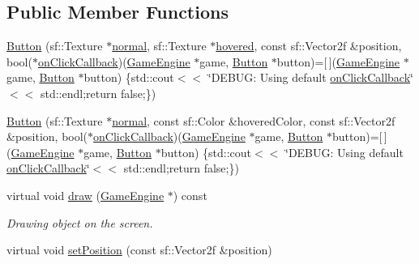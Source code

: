 \subsection*{Public Member Functions}
\begin{DoxyCompactItemize}
\item 
\mbox{\hyperlink{class_button_ad5ab6d97ef7c833c56e968c1202a19b8}{Button}} (sf\+::\+Texture $\ast$\mbox{\hyperlink{class_button_a5a2a5e1c6b378762f5b2fe39e9053d9e}{normal}}, sf\+::\+Texture $\ast$\mbox{\hyperlink{class_button_a181477cb3462763b510a30a4f27cd756}{hovered}}, const sf\+::\+Vector2f \&position, bool($\ast$\mbox{\hyperlink{class_button_a24293b3761997dd52758ee21c0058661}{on\+Click\+Callback}})(\mbox{\hyperlink{class_game_engine}{Game\+Engine}} $\ast$game, \mbox{\hyperlink{class_button}{Button}} $\ast$button)=\mbox{[}$\,$\mbox{]}(\mbox{\hyperlink{class_game_engine}{Game\+Engine}} $\ast$game, \mbox{\hyperlink{class_button}{Button}} $\ast$button) \{std\+::cout$<$$<$ \char`\"{}D\+E\+B\+U\+G\+: Using default \mbox{\hyperlink{class_button_a24293b3761997dd52758ee21c0058661}{on\+Click\+Callback}}\char`\"{}$<$$<$ std\+::endl;return false;\})
\item 
\mbox{\hyperlink{class_button_a098eb3dc799079f8c1530eabea57a195}{Button}} (sf\+::\+Texture $\ast$\mbox{\hyperlink{class_button_a5a2a5e1c6b378762f5b2fe39e9053d9e}{normal}}, const sf\+::\+Color \&hovered\+Color, const sf\+::\+Vector2f \&position, bool($\ast$\mbox{\hyperlink{class_button_a24293b3761997dd52758ee21c0058661}{on\+Click\+Callback}})(\mbox{\hyperlink{class_game_engine}{Game\+Engine}} $\ast$game, \mbox{\hyperlink{class_button}{Button}} $\ast$button)=\mbox{[}$\,$\mbox{]}(\mbox{\hyperlink{class_game_engine}{Game\+Engine}} $\ast$game, \mbox{\hyperlink{class_button}{Button}} $\ast$button) \{std\+::cout$<$$<$ \char`\"{}D\+E\+B\+U\+G\+: Using default \mbox{\hyperlink{class_button_a24293b3761997dd52758ee21c0058661}{on\+Click\+Callback}}\char`\"{}$<$$<$ std\+::endl;return false;\})
\item 
virtual void \mbox{\hyperlink{class_button_a99e75218b31357786cff815f87f1a093}{draw}} (\mbox{\hyperlink{class_game_engine}{Game\+Engine}} $\ast$) const
\begin{DoxyCompactList}\small\item\em Drawing object on the screen. \end{DoxyCompactList}\item 
virtual void \mbox{\hyperlink{class_button_a95a9aafc24ed5d95d3557f7155832433}{set\+Position}} (const sf\+::\+Vector2f \&position)
\item 

\end{DoxyCompactItemize}
